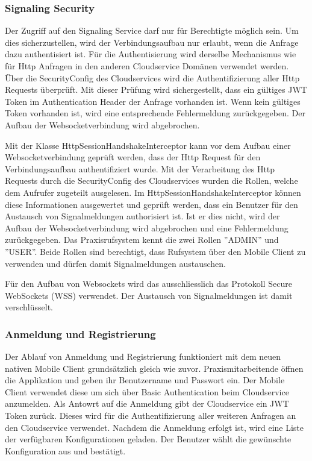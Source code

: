 \subsubsection{Signaling Security}

Der Zugriff auf den Signaling Service darf nur für Berechtigte möglich sein.
Um dies sicherzustellen, wird der Verbindungsaufbau nur erlaubt, wenn die Anfrage dazu authentisiert ist.
Für die Authentisierung wird derselbe Mechanismus wie für Http Anfragen in den anderen Cloudservice Domänen verwendet werden.
Über die SecurityConfig des Cloudservices wird die Authentifizierung aller Http Requests überprüft.
Mit dieser Prüfung wird sichergestellt, dass ein gültiges JWT Token im Authentication Header der Anfrage vorhanden ist.
Wenn kein gültiges Token vorhanden ist, wird eine entsprechende Fehlermeldung zurückgegeben.
Der Aufbau der Websocketverbindung wird abgebrochen.

Mit der Klasse HttpSessionHandshakeInterceptor kann vor dem Aufbau einer Websocketverbindung geprüft werden, dass der Http Request für den Verbindungsaufbau authentifiziert wurde.
Mit der Verarbeitung des Http Requests durch die SecurityConfig des Cloudservices wurden die Rollen, welche dem Aufrufer zugeteilt ausgelesen.
Im HttpSessionHandshakeInterceptor können diese Informationen ausgewertet und geprüft werden, dass ein Benutzer für den Austausch von Signalmeldungen authorisiert ist.
Ist er dies nicht, wird der Aufbau der Websocketverbindung wird abgebrochen und eine Fehlermeldung zurückgegeben.
Das Praxisrufsystem kennt die zwei Rollen ''ADMIN'' und ''USER''.
Beide Rollen sind berechtigt, dass Rufsystem über den Mobile Client zu verwenden und dürfen damit Signalmeldungen austauschen.

Für den Aufbau von Websockets wird das ausschliesslich das Protokoll Secure WebSockets (WSS) verwendet.
Der Austausch von Signalmeldungen ist damit verschlüsselt.

\clearpage

\subsubsection{Anmeldung und Registrierung}

Der Ablauf von Anmeldung und Registrierung funktioniert mit dem neuen nativen Mobile Client grundsätzlich gleich wie zuvor.
Praxismitarbeitende öffnen die Applikation und geben ihr Benutzername und Passwort ein.
Der Mobile Client verwendet diese um sich über Basic Authentication beim Cloudservice anzumelden.
Als Antowrt auf die Anmeldung gibt der Cloudservice ein JWT Token zurück.
Dieses wird für die Authentifizierung aller weiteren Anfragen an den Cloudservice verwendet.
Nachdem die Anmeldung erfolgt ist, wird eine Liste der verfügbaren Konfigurationen geladen.
Der Benutzer wählt die gewünschte Konfiguration aus und bestätigt.

